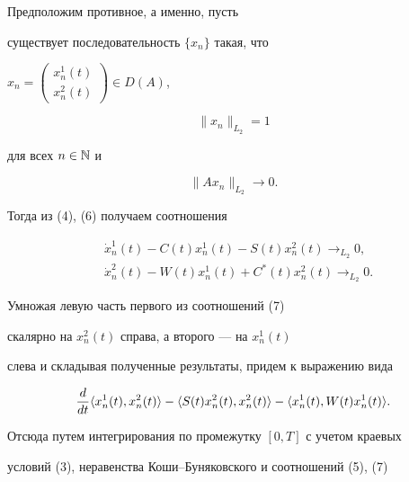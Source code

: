 \begin{pf}


Предположим противное, а именно, пусть


существует последовательность $\{x_{n}\}$ такая, что


$x_{n}=\left(\begin{smallmatrix}x^{1}_{n}(t)\\ x^{2}_{n}(t)


\end{smallmatrix}\right)\in D(A)$,


\begin{equation}


\|x_{n}\|_{L_{2}}=1


\end{equation}


для всех $n\in \Bbb N$ и


\begin{equation}


\|Ax_{n}\|_{L_{2}}\to0.


\end{equation}


Тогда из (4), (6) получаем соотношения


\begin{equation}


\begin{split}


&\Dot x^1_n(t)-C(t)x^{1}_{n}(t)-S(t)x^{2}_{n}(t)\to_{L_{2}}0,\\


&\Dot x^2_n(t)-W(t)x^{1}_{n}(t)+C^{*}(t)x^{2}_{n}(t)\to_{L_{2}}0.


\end{split}


\end{equation}


Умножая левую часть первого из соотношений (7)


скалярно на $x^{2}_{n}(t)$ справа, а второго --- на $x^{1}_{n}(t)$


слева и складывая полученные результаты, придем к выражению вида


$$


\frac{d}{dt}\la x^{1}_{n}(t),x^{2}_{n}(t)\ra-


\la S(t)x^{2}_{n}(t),x^{2}_{n}(t)\ra-\la x^{1}_{n}(t),W(t)x^{1}_{n}(t)\ra.


$$


Отсюда путем интегрирования по промежутку $[0,T]$ с учетом краевых


условий (3), неравенства Коши--Буняковского и соотношений (5), (7)



\end{pf}
